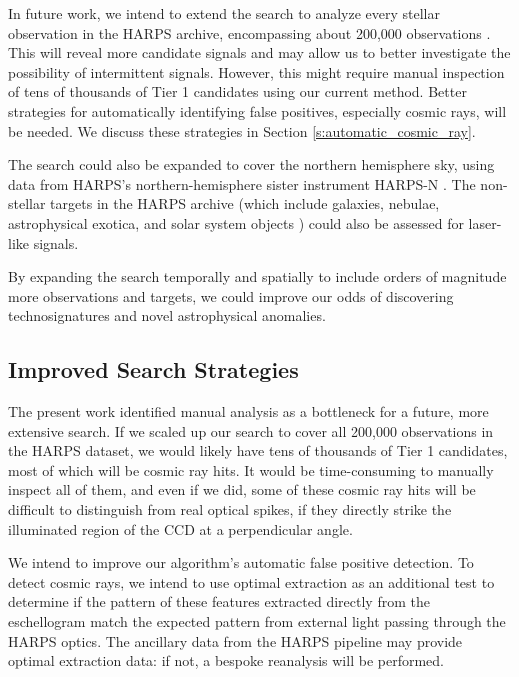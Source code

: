 \documentclass[twocolumn]{aastex701}
\begin{document}
In future work, we intend to extend the search to analyze every stellar observation in the HARPS archive, encompassing about 200,000 observations \citep{trifonov_2020}.  This will reveal more candidate signals and may allow us to better investigate the possibility of intermittent signals.  However, this might require manual inspection of tens of thousands of Tier 1 candidates using our current method.  Better strategies for automatically identifying false positives, especially cosmic rays, will be needed.  We discuss these strategies in Section \ref{s:automatic_cosmic_ray}.

The search could also be expanded to cover the northern hemisphere sky, using data from HARPS's northern-hemisphere sister instrument HARPS-N \citep{HARPS_N}.  The non-stellar targets in the HARPS archive (which include galaxies, nebulae, astrophysical exotica, and solar system objects \citep{trifonov_2020}) could also be assessed for laser-like signals.

By expanding the search temporally and spatially to include orders of magnitude more observations and targets, we could improve our odds of discovering technosignatures and novel astrophysical anomalies. 

\subsection{Improved Search Strategies}

The present work identified manual analysis as a bottleneck for a future, more extensive search. If we scaled up our search to cover all 200,000 observations in the HARPS dataset, we would likely have tens of thousands of Tier 1 candidates, most of which will be cosmic ray hits.  It would be time-consuming to manually inspect all of them, and even if we did, some of these cosmic ray hits will be difficult to distinguish from real optical spikes, if they directly strike the illuminated region of the CCD at a perpendicular angle.

We intend to improve our algorithm's automatic false positive detection. To detect cosmic rays, we intend to use optimal extraction \citep{horne86optimal_extraction} as an additional test to determine if the pattern of these features extracted directly from the eschellogram  match the expected pattern from external light passing through the HARPS optics. The ancillary data from the HARPS pipeline \citep{HARPS_specs} may provide optimal extraction data: if not, a bespoke reanalysis will be performed. 
\end{document}
